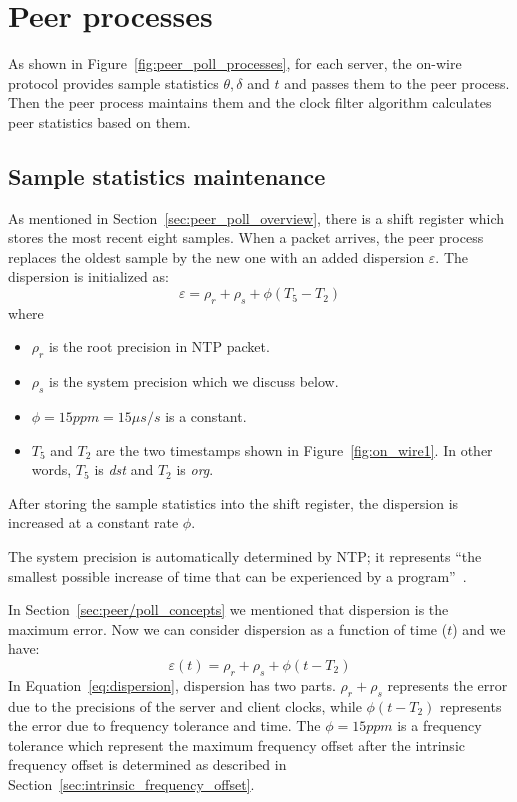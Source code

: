 \section{Peer processes}%
\label{sec:peer_processes}
As shown in Figure~\ref{fig:peer_poll_processes}, 
for each server, the on-wire protocol provides sample statistics $\theta,
\delta$ and $t$ and passes them to the peer process. Then the peer process
maintains them and the clock filter algorithm calculates peer statistics based
on them.

\subsection{Sample statistics maintenance}%
\label{sub:sample_statistics_maintenance}
As mentioned in Section~\ref{sec:peer_poll_overview}, there is a shift register
which stores the most recent eight samples. When a packet arrives, the peer
process replaces the oldest sample by the new one with an added dispersion
$\varepsilon$.
The dispersion is initialized as:
$$ \varepsilon = \rho_r + \rho_s + \phi (T_5 - T_2) $$
where 
\begin{itemize}
    \item 
        $\rho_r$ is the root precision in NTP packet. 
    \item 
        $\rho_s$ is the system
        precision which we discuss below.
    \item
        $\phi = 15 ppm = 15 \mu s/s$ is a constant.
    \item
        $T_5$ and $T_2$ are the two timestamps shown in
        Figure~\ref{fig:on_wire1}. In other words, $T_5$ is \emph{dst} and
        $T_2$ is \emph{org}.
\end{itemize}
After storing the sample statistics into the shift register, the dispersion
is increased at a constant rate $\phi$. 

The system precision is automatically determined by NTP; it represents 
``the smallest possible increase of time that can be experienced by a
program''~\cite{precision}.

In Section~\ref{sec:peer/poll_concepts} we mentioned that dispersion is the
maximum error. Now we can consider dispersion as a function of time ($t$) and
we have:
\begin{equation}
    \varepsilon(t) = \rho_r + \rho_s + \phi (t - T_2)
    \label{eq:dispersion}
\end{equation}
In Equation~\ref{eq:dispersion}, dispersion has two parts. $\rho_r + \rho_s$
represents the error due to the precisions of the server and client clocks,
while $\phi (t - T_2)$ represents the error due to frequency tolerance and
time.  The $\phi = 15ppm$ is a frequency tolerance which represent the maximum
frequency offset after the intrinsic frequency offset is determined as
described in Section~\ref{sec:intrinsic_frequency_offset}.

